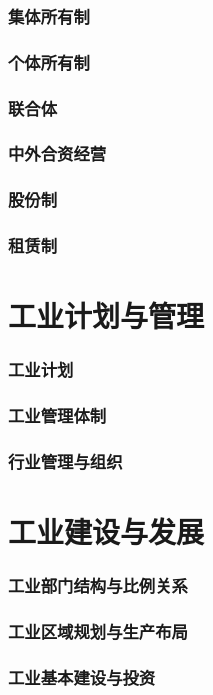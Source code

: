 \documentclass[UTF8]{../../RepresentationUniverse}
\begin{document}
        \subsubsection{集体所有制}
        \subsubsection{个体所有制}
        \subsubsection{联合体}
        \subsubsection{中外合资经营}
        \subsubsection{股份制}
        \subsubsection{租赁制}

\section{工业计划与管理}
    \subsubsection{工业计划}
    \subsubsection{工业管理体制}
    \subsubsection{行业管理与组织}
\section{工业建设与发展}
    \subsubsection{工业部门结构与比例关系}
    \subsubsection{工业区域规划与生产布局}
    \subsubsection{工业基本建设与投资}
\end{document}
